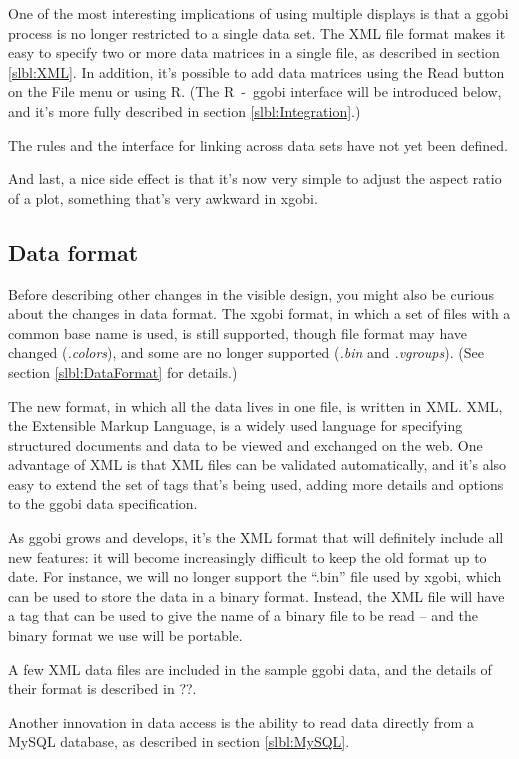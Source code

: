 \documentclass[11pt]{article}
\begin{document}
One of the most interesting implications of using multiple displays
is that a ggobi process is no longer restricted to a single data
set.  The XML file format makes it easy to specify two or more data
matrices in a single file, as described in section \ref{slbl:XML}.
In addition, it's possible to add data matrices using the Read button
on the File menu or using R.  (The R~-~ggobi interface will be
introduced below, and it's more fully described in section
\ref{slbl:Integration}.)

The rules and the interface for linking across data sets have not yet
been defined.

And last, a nice side effect is that it's now very simple to
adjust the aspect ratio of a plot, something that's very awkward in
xgobi.

\subsection {Data format}

Before describing other changes in the visible design, you might
also be curious about the changes in data format.  The xgobi
format, in which a set of files with a common base name is used,
is still supported, though file format may have changed ({\em .colors}),
and some are no longer supported ({\em .bin} and {\em .vgroups}).
(See section \ref{slbl:DataFormat} for details.)

The new format, in which all the data lives in one file, is written
in XML.  XML, the Extensible Markup Language, is a widely used
language for specifying structured documents and data to
be viewed and exchanged on the web.  One advantage of XML is
that XML files can be validated automatically, and it's also
easy to extend the set of tags that's being used, adding more
details and options to the ggobi data specification.

As ggobi grows and develops, it's the XML format that will
definitely include all new features: it will become increasingly
difficult to keep the old format up to date.  For instance, we
will no longer support the ``.bin'' file used by xgobi, which
can be used to store the data in a binary format.  Instead,
the XML file will have a tag that can be used to give the
name of a binary file to be read -- and the binary format we
use will be portable.

A few XML data files are included in the sample ggobi data, and
the details of their format is described in ??.

Another innovation in data access is the ability to read data
directly from a MySQL database, as described in section \ref{slbl:MySQL}.
\end{document}
